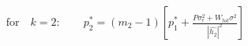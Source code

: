 \documentclass[preview]{standalone}
\begin{document}
\begin{align*}
\text{for} \quad k=2: \qquad p_2^\ast = \left(m_2 - 1\right) \left[p_1^\ast + \frac{P \sigma_\epsilon^2 + W_{tot} \sigma^2}{\left|\hat{h_2}\right|^2}\right]
\end{align*}
\end{document}
